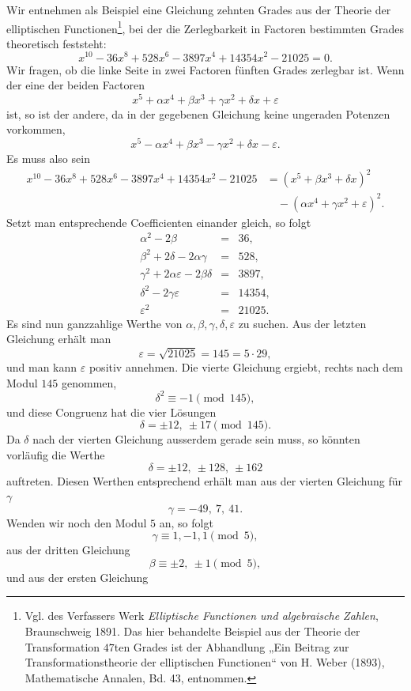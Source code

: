 \documentclass[11pt]{article}
\begin{document}
Wir entnehmen als Beispiel eine Gleichung zehnten Grades aus der Theorie der elliptischen Functionen\footnote{Vgl. des Verfassers Werk \emph{Elliptische Functionen und algebraische Zahlen}, Braunschweig 1891. Das hier behandelte Beispiel aus der Theorie der Transformation $47$ten Grades ist der Abhandlung „Ein Beitrag zur Transformationstheorie der elliptischen Functionen“ von H. Weber (1893), Mathematische Annalen, Bd. 43, entnommen.}, bei der die Zerlegbarkeit in Factoren bestimmten Grades theoretisch feststeht:
\[
        x^{10}-36x^8+528x^6-3897x^4+14354x^2-21025=0.
\]
Wir fragen, ob die linke Seite in zwei Factoren fünften Grades zerlegbar ist. Wenn der eine der beiden Factoren
\[
        x^5+\alpha x^4+\beta x^3+\gamma x^2+\delta x+\varepsilon
\]
ist, so ist der andere, da in der gegebenen Gleichung keine ungeraden Potenzen vorkommen,
\[
        x^5-\alpha x^4+\beta x^3-\gamma x^2+\delta x-\varepsilon.
\]
Es muss also sein
\[
\begin{aligned}
x^{10}-36x^8+528x^6-3897x^4+14354x^2-21025
&=(x^5+\beta x^3+\delta x)^2\\
&\quad -(\alpha x^4+\gamma x^2+\varepsilon)^2 .
\end{aligned}
\]
Setzt man entsprechende Coefficienten einander gleich, so folgt
\[
\begin{array}{rcl}
\alpha^2-2\beta&=&36,\\
\beta^2+2\delta-2\alpha\gamma&=&528,\\
\gamma^2+2\alpha\varepsilon-2\beta\delta&=&3897,\\
\delta^2-2\gamma\varepsilon&=&14354,\\
\varepsilon^2&=&21025.
\end{array}
\]
Es sind nun ganzzahlige Werthe von $\alpha,\beta,\gamma,\delta,\varepsilon$ zu suchen. Aus der letzten Gleichung erhält man
\[
        \varepsilon=\sqrt{21025}=145=5\cdot29,
\]
und man kann $\varepsilon$ positiv annehmen. Die vierte Gleichung ergiebt, rechts nach dem Modul $145$ genommen,
\[
\tag{4}        \delta^2\equiv -1\pmod{145},
\]
und diese Congruenz hat die vier Lösungen
\[
        \delta=\pm12,\ \pm17\pmod{145}.
\]
Da $\delta$ nach der vierten Gleichung ausserdem gerade sein muss, so könnten vorläufig die Werthe
\[
        \delta=\pm12,\ \pm128,\ \pm162
\]
auftreten. Diesen Werthen entsprechend erhält man aus der vierten Gleichung für $\gamma$
\[
        \gamma=-49,\ 7,\ 41.
\]
Wenden wir noch den Modul $5$ an, so folgt
\[
        \gamma\equiv 1,-1,1\pmod5,
\]
aus der dritten Gleichung
\[
        \beta\equiv \pm2,\ \pm1\pmod5,
\]
und aus der ersten Gleichung
\end{document}
